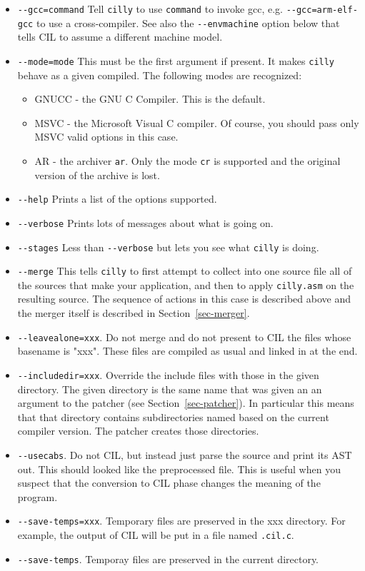 \documentclass[letterpaper]{article}
\def\secref#1{Section~\ref{sec-#1}}
\def\t#1{{\tt #1}}
\begin{document}
\begin{itemize}
\item \t{-{}-gcc=command} Tell \t{cilly} to use \t{command} to invoke
  gcc, e.g.  \t{-{}-gcc=arm-elf-gcc} to use a cross-compiler. See also
  the \t{-{}-envmachine} option below that tells CIL to assume a
  different machine model.
\item \t{-{}-mode=mode} This must be the first argument if present. It makes
\t{cilly} behave as a given compiled. The following modes are recognized: 
     \begin{itemize}
        \item GNUCC - the GNU C Compiler. This is the default.
        \item MSVC - the Microsoft Visual C compiler. Of course, you should
                     pass only MSVC valid options in this case. 
        \item AR - the archiver \t{ar}. Only the mode \t{cr} is supported and
                   the original version of the archive is lost. 
     \end{itemize}
\item \t{-{}-help} Prints a list of the options supported.
\item \t{-{}-verbose} Prints lots of messages about what is going on.
\item \t{-{}-stages} Less than \t{-{}-verbose} but lets you see what \t{cilly}
                   is doing. 
\item \t{-{}-merge} This tells \t{cilly} to first attempt to collect into one
source file all of the sources that make your application, and then to apply
\t{cilly.asm} on the resulting source. The sequence of actions in this case is
described above and the merger itself is described in \secref{merger}.

\item \t{-{}-leavealone=xxx}. Do not merge and do not present to CIL the files
whose basename is "xxx". These files are compiled as usual and linked in at
the end. 
\item \t{-{}-includedir=xxx}. Override the include files with those in the given
directory. The given directory is the same name that was given an an argument
to the patcher (see \secref{patcher}). In particular this means that
that directory contains subdirectories named based on the current compiler
version. The patcher creates those directories. 
\item \t{-{}-usecabs}. Do not CIL, but instead just parse the source and print
its AST out. This should looked like the preprocessed file. This is useful
when you suspect that the conversion to CIL phase changes the meaning of the
program. 
\item \t{-{}-save-temps=xxx}. Temporary files are preserved in the xxx
  directory.  For example, the output of CIL will be put in a file
  named \t{*.cil.c}.
\item \t{-{}-save-temps}. Temporay files are preserved in the current directory.
\end{itemize}
 
\end{document}
